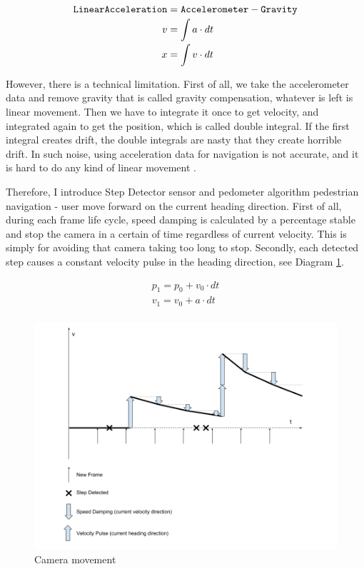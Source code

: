 \[
\begin{array}{lr}
\begin{aligned}
\texttt{LinearAcceleration} &= \texttt{Accelerometer} - \texttt{Gravity}\\
v &= \int a \cdot dt\\
x &= \int v \cdot dt\\
\end{aligned}
\end{array}
\]

However, there is a technical limitation. First of all, we take the accelerometer data and remove gravity that is called gravity compensation, whatever is left is linear movement. Then we have to integrate it once to get velocity, and integrated again to get the position, which is called double integral. If the first integral creates drift, the double integrals are nasty that they create horrible drift. In such noise, using acceleration data for navigation is not accurate, and it is hard to do any kind of linear movement \cite{google.sensor-fusion.2010}.

Therefore, I introduce Step Detector sensor and pedometer algorithm pedestrian navigation - user move forward on the current heading direction. First of all, during each frame life cycle, speed damping is calculated by a percentage stable and stop the camera in a certain of time regardless of current velocity. This is simply for avoiding that camera taking too long to stop. Secondly, each detected step causes a constant velocity pulse in the heading direction, see Diagram \ref{fig:camera-movement}.

\[
\begin{array}{lr}
p_1 = p_0 + v_0 \cdot dt\\
v_1 = v_0 + a \cdot dt\\
\end{array}
\]

\begin{figure}[H]
\caption{Camera movement}
\label{fig:camera-movement}
\centering
\includegraphics[width=\linewidth]{Figures/camera-movement.png}
\decoRule
\end{figure}

